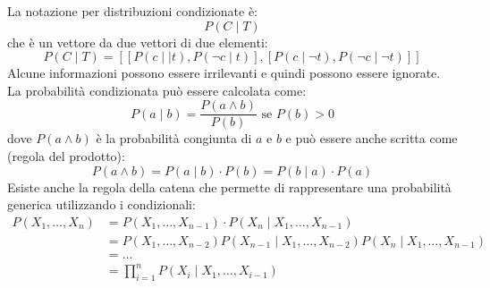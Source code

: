\documentclass[a4paper]{article}
\begin{document}
\vspace{1em}
\noindent
La notazione per distribuzioni condizionate è:
\[
  P(C \;|\; T)
\] 
che è un vettore da due vettori di due elementi:
\[
  P(C \;|\; T) = \left[ \left[ P(c \;|\;| t), P(\neg c \;|\; t) \right],
  \left[ P(c \;|\; \neg t), P(\neg c \;|\; \neg t) \right] \right]
\] 
Alcune informazioni possono essere irrilevanti e quindi possono essere ignorate.
La probabilità condizionata può essere calcolata come:
\[
  P(a \;|\; b) = \frac{P(a \wedge b)}{P(b)} \text{ se } P(b) > 0
\] 
dove \( P(a \wedge b) \) è la probabilità congiunta di \( a \) e \( b \) e può essere
anche scritta come (regola del prodotto):
\[
  P(a \wedge b) = P(a \;|\; b) \cdot P(b) = P(b \;|\; a) \cdot P(a)
\] 
Esiste anche la regola della catena che permette di rappresentare una probabilità generica
utilizzando i condizionali:
\[
  \begin{aligned}
    P(X_1, \ldots, X_n) &= P(X_1, \ldots, X_{n-1}) \cdot P(X_n \;|\; X_1, \ldots, X_{n-1}) \\
                        &= P(X_1, \ldots, X_{n-2}) P(X_{n-1} \;|\; X_1, \ldots, X_{n-2})
                        P(X_n \;|\; X_1, \ldots, X_{n-1}) \\
                        &= \ldots \\
                        &= \prod_{i=1}^{n} P(X_i \;|\; X_1, \ldots, X_{i-1})
  \end{aligned}
\] 
\end{document}
